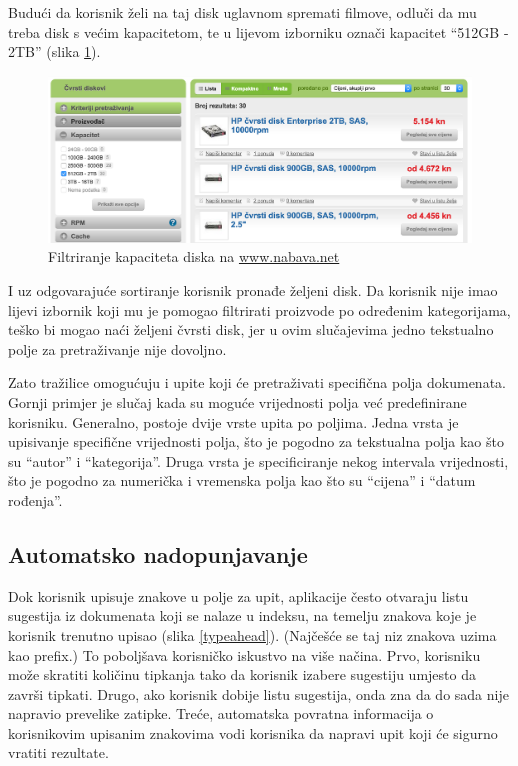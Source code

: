 \documentclass[a4paper,twoside,12pt]{scrreprt}
\begin{document}
Budući da korisnik želi na taj disk uglavnom spremati filmove, odluči da mu treba disk s većim kapacitetom, te u lijevom izborniku označi kapacitet ``512GB - 2TB'' (slika \ref{nabava3}).

\begin{figure}[H]
  \centering
  \includegraphics[width=\textwidth]{nabava3}
  \caption{Filtriranje kapaciteta diska na \url{www.nabava.net}}
  \label{nabava3}
\end{figure}

I uz odgovarajuće sortiranje korisnik pronađe željeni disk. Da korisnik nije imao lijevi izbornik koji mu je pomogao filtrirati proizvode po određenim kategorijama, teško bi mogao naći željeni čvrsti disk, jer u ovim slučajevima jedno tekstualno polje za pretraživanje nije dovoljno.

Zato tražilice omogućuju i upite koji će pretraživati specifična polja dokumenata. Gornji primjer je slučaj kada su moguće vrijednosti polja već predefinirane korisniku. Generalno, postoje dvije vrste upita po poljima. Jedna vrsta je upisivanje specifične vrijednosti polja, što je pogodno za tekstualna polja kao što su ``autor'' i ``kategorija''. Druga vrsta je specificiranje nekog intervala vrijednosti, što je pogodno za numerička i vremenska polja kao što su ``cijena'' i ``datum rođenja''.


\subsection{Automatsko nadopunjavanje}

Dok korisnik upisuje znakove u polje za upit, aplikacije često otvaraju listu sugestija iz dokumenata koji se nalaze u indeksu, na temelju znakova koje je korisnik trenutno upisao (slika \ref{typeahead}). (Najčešće se taj niz znakova uzima kao prefix.) To poboljšava korisničko iskustvo na više načina. Prvo, korisniku može skratiti količinu tipkanja tako da korisnik izabere sugestiju umjesto da završi tipkati. Drugo, ako korisnik dobije listu sugestija, onda zna da do sada nije napravio prevelike zatipke. Treće, automatska povratna informacija o korisnikovim upisanim znakovima vodi korisnika da napravi upit koji će sigurno vratiti rezultate.
\end{document}
